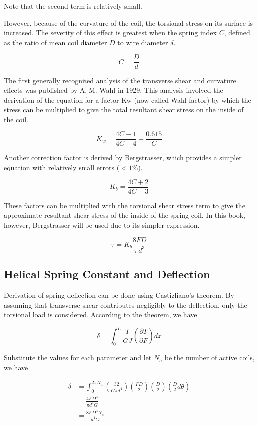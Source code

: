 \documentclass[a4paper,openany,12pt]{book}
\begin{document}
{{Note that the second term is relatively small.

However, because of the curvature of the coil, the torsional stress on
its surface is increased. The severity of this effect is greatest when
the spring index \(C\), defined as the ratio of mean coil diameter \(D\) to
wire diameter \(d\).

$$C = \frac{D}{d}$$

The first generally recognized analysis of the transverse shear and
curvature effects was published by A. M. Wahl in 1929. This analysis
involved the derivation of the equation for a factor Kw (now called Wahl
factor) by which the stress can be multiplied to give the total
resultant shear stress on the inside of the coil.

$$K_w = \frac{4C - 1}{4C - 4} + \frac{0.615}{C}$$

Another correction factor is derived by Bergstrasser, which provides a
simpler equation with relatively small errors (\(< 1\%\)).

$$K_b = \frac{4C + 2}{4C - 3}$$

These factors can be multiplied with the torsional shear stress term to
give the approximate resultant shear stress of the inside of the spring
coil. In this book, however, Bergstrasser will be used due to its
simpler expression.

$$\tau  = K_b\frac{8FD}{\pi d^3}$$

\subsection{Helical Spring Constant and Deflection}
\label{sec:org34161bc}
Derivation of spring deflection can be done using Castigliano's theorem.
By assuming that transverse shear contributes negligibly to the
deflection, only the torsional load is considered. According to the
theorem, we have

$$\delta  = \int_0^L \frac{T}{GJ}\left( \frac{\partial T}{\partial F} \right)dx$$

Substitute the values for each parameter and let \(N_a\) be the number of
active coils, we have

$$\begin{aligned}
  \delta  &= \int_0^{2\pi N_a} \left( \frac{32}{G\pi d^4} \right)\left( \frac{FD}{2} \right)\left( \frac{D}{2} \right)\left( \frac{D}{2}d\theta  \right) \\ 
          &= \frac{4FD^3}{\pi d^4G} \\ 
          &= \frac{8FD^3N_a}{d^4G}\end{aligned}$$

}}
\end{document}

